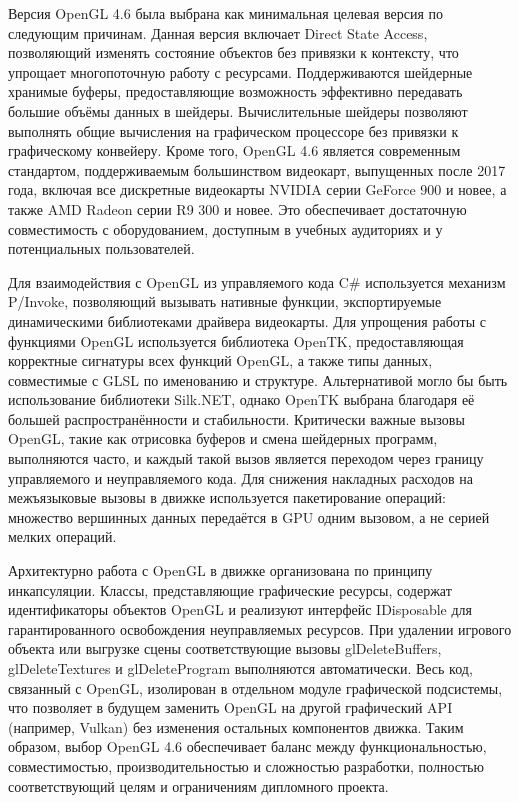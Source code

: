 Версия OpenGL 4.6 была выбрана как минимальная целевая версия по следующим причинам. Данная версия включает Direct State Access, позволяющий изменять состояние объектов без привязки к контексту, что упрощает многопоточную работу с ресурсами. Поддерживаются шейдерные хранимые буферы, предоставляющие возможность эффективно передавать большие объёмы данных в шейдеры. Вычислительные шейдеры позволяют выполнять общие вычисления на графическом процессоре без привязки к графическому конвейеру. Кроме того, OpenGL 4.6 является современным стандартом, поддерживаемым большинством видеокарт, выпущенных после 2017 года, включая все дискретные видеокарты NVIDIA серии GeForce 900 и новее, а также AMD Radeon серии R9 300 и новее. Это обеспечивает достаточную совместимость с оборудованием, доступным в учебных аудиториях и у потенциальных пользователей.

Для взаимодействия с OpenGL из управляемого кода C\# используется механизм P/Invoke, позволяющий вызывать нативные функции, экспортируемые динамическими библиотеками драйвера видеокарты. Для упрощения работы с функциями OpenGL используется библиотека OpenTK, предоставляющая корректные сигнатуры всех функций OpenGL, а также типы данных, совместимые с GLSL по именованию и структуре. Альтернативой могло бы быть использование библиотеки Silk.NET, однако OpenTK выбрана благодаря её большей распространённости и стабильности. Критически важные вызовы OpenGL, такие как отрисовка буферов и смена шейдерных программ, выполняются часто, и каждый такой вызов является переходом через границу управляемого и неуправляемого кода. Для снижения накладных расходов на межъязыковые вызовы в движке используется пакетирование операций: множество вершинных данных передаётся в GPU одним вызовом, а не серией мелких операций.

Архитектурно работа с OpenGL в движке организована по принципу инкапсуляции. Классы, представляющие графические ресурсы, содержат идентификаторы объектов OpenGL и реализуют интерфейс IDisposable для гарантированного освобождения неуправляемых ресурсов. При удалении игрового объекта или выгрузке сцены соответствующие вызовы glDeleteBuffers, glDeleteTextures и glDeleteProgram выполняются автоматически. Весь код, связанный с OpenGL, изолирован в отдельном модуле графической подсистемы, что позволяет в будущем заменить OpenGL на другой графический API (например, Vulkan) без изменения остальных компонентов движка. Таким образом, выбор OpenGL 4.6 обеспечивает баланс между функциональностью, совместимостью, производительностью и сложностью разработки, полностью соответствующий целям и ограничениям дипломного проекта.


